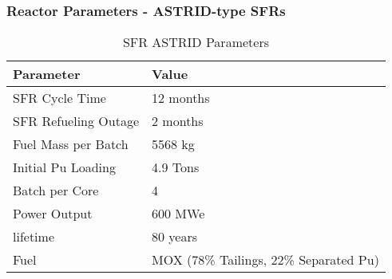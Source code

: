 \begin{frame}
	\frametitle{Reactor Parameters - ASTRID-type SFRs}
	
\begin{table}[h]
	\centering
	\begin{tabularx}{\textwidth}{bb}
		\hline
		Parameter & Value \\
		\hline
		SFR Cycle Time & 12 months \\ 
		SFR Refueling Outage & 2 months \\
		Fuel Mass per Batch & 5568 kg \\
        Initial Pu Loading & 4.9 Tons \\
		Batch per Core & 4 \\
		Power Output & 600 MWe \\
		lifetime & 80 years \\
		Fuel & {\small \gls{MOX} (78\% Tailings, 22\% Separated Pu)}\\
		\hline
	\end{tabularx}
	\caption {\gls{SFR} ASTRID Parameters \cite{varaine_pre-conceptual_2012}}
	\label{tab:sfr}
\end{table}
\end{frame}
